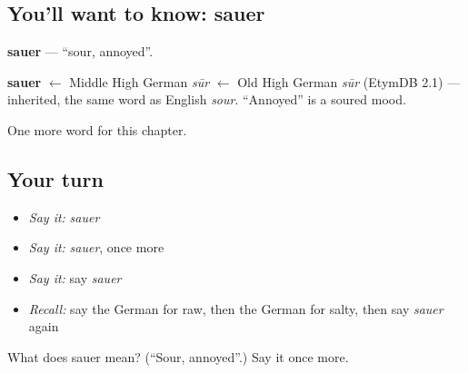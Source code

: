 \subsection*{You'll want to know: sauer}
\textbf{sauer} — \textquotedblleft{}sour, annoyed\textquotedblright{}.

\begin{cousinweb}
\textbf{sauer} $\leftarrow$ Middle High German \emph{sūr} $\leftarrow$ Old High German \emph{sūr} (EtymDB 2.1) — inherited, the same word as English \emph{sour}. \textquotedblleft{}Annoyed\textquotedblright{} is a soured mood.
\end{cousinweb}

\begin{grammarlens}[title={What you've built}]
One more word for this chapter.
\end{grammarlens}

\subsection*{Your turn}
\begin{itemize}
\raggedright
  \item \emph{Say it:} \emph{sauer}
  \item \emph{Say it:} \emph{sauer}, once more
  \item \emph{Say it:} say \emph{sauer}
  \item \emph{Recall:} say the German for raw, then the German for salty, then say \emph{sauer} again
\end{itemize}

\begin{tcolorbox}[breakable,colback=teal!4,colframe=teal!35!black,title={Before you move on}]
What does sauer mean? (\textquotedblleft{}Sour, annoyed\textquotedblright{}.) Say it once more.
\end{tcolorbox}
